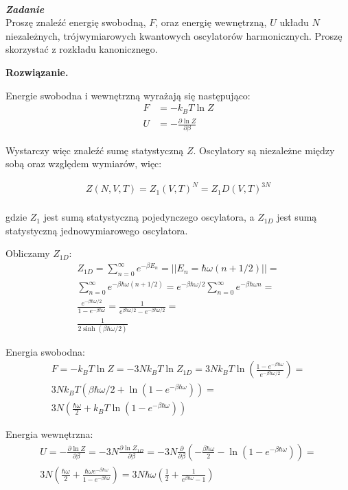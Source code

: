 \documentclass[11pt,a4paper]{article}
\newcounter{zadanie}\newcommand{\zadanie}[1][]{\addtocounter{zadanie}{1} ~\\ {\bf \emph{Zadanie \arabic{zadanie} #1 }} \\}
\newenvironment{solution}{\vspace{1cm} \par\textbf{Rozwiązanie.} \vspace{1cm}}{}
\begin{document}
\zadanie[]

Proszę znaleźć energię swobodną, $F$, oraz 
energię wewnętrzną, $U$ układu $N$ niezależnych,
trójwymiarowych kwantowych oscylatorów harmonicznych. 
Proszę skorzystać z rozkładu kanonicznego.

\begin{solution}

Energie swobodna i wewnętrzną wyrażają się następująco:
\begin{align*}
F &= -k_B T \ln Z \\
U &=  - \frac{\partial \ln Z}{\partial \beta} 
\end{align*}

Wystarczy więc znaleźć sumę statystyczną $Z$. 
Oscylatory są niezależne między sobą oraz względem 
wymiarów, więc:

\begin{align*}
  Z(N,V,T) = Z_1(V,T)^N = Z_1D(V,T)^{3N} \\
\end{align*}

gdzie $Z_1$ jest sumą statystyczną pojedynczego oscylatora,
a $Z_{1D}$ jest sumą statystyczną jednowymiarowego oscylatora.

Obliczamy $Z_{1D}$:
\begin{align*}
Z_{1D} = \sum_{n=0}^{\infty} e^{-\beta E_n} = 
|| E_n = \hbar \omega (n + 1/2) || = \\
\sum_{n=0}^{\infty} e^{-\beta \hbar \omega (n + 1/2)} = 
e^{-\beta \hbar \omega / 2} \sum_{n=0}^{\infty} e^{-\beta \hbar \omega n} = \\
\frac{e^{-\beta \hbar \omega / 2}}{1 - e^{-\beta \hbar \omega}} =
\frac{1}{e^{\beta \hbar \omega/2} - e^{-\beta \hbar \omega/2}} = \\
\frac{1}{2 \sinh(\beta \hbar \omega / 2)}
\end{align*}

Energia swobodna:
\begin{align*}
F = -k_B T \ln Z = -3N k_B T \ln Z_{1D} = 
3N k_B T \ln \left( \frac{1 - e^{-\beta \hbar \omega}}{e^{-\beta \hbar \omega / 2}} \right) = \\
3N k_B T \left(\beta \hbar \omega / 2 + \ln(1 - e^{-\beta \hbar \omega}) \right) = \\
3N \left( \frac{\hbar \omega}{2} + k_B T \ln(1 - e^{-\beta \hbar \omega}) \right)
\end{align*}

Energia wewnętrzna:
\begin{align*}
U = - \frac{\partial \ln Z}{\partial \beta} =
-3N \frac{\partial \ln Z_{1D}}{\partial \beta} =
-3N \frac{\partial}{\partial \beta} \left( -\frac{\beta \hbar \omega}{2} - \ln(1 - e^{-\beta \hbar \omega}) \right) = \\
3N \left( \frac{\hbar \omega}{2} + \frac{\hbar \omega e^{-\beta \hbar \omega}}{1 - e^{-\beta \hbar \omega}} \right) = 
3N \hbar \omega \left( \frac{1}{2} + \frac{1}{e^{\beta \hbar \omega} - 1} \right)
\end{align*}

\newpage
\end{solution}
\end{document}
